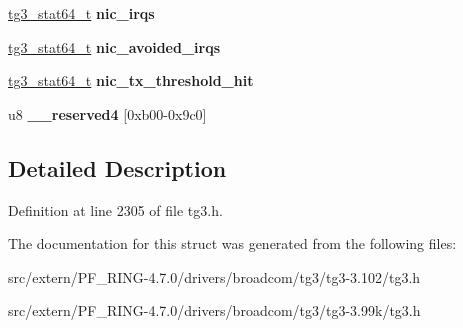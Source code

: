 \begin{DoxyCompactItemize}
\item 
\hypertarget{structtg3__hw__stats_a4246f9d461fb7c092804bb0cc6f0c941}{
\hyperlink{structtg3__stat64__t}{tg3\_\-stat64\_\-t} {\bfseries nic\_\-irqs}}
\label{structtg3__hw__stats_a4246f9d461fb7c092804bb0cc6f0c941}

\item 
\hypertarget{structtg3__hw__stats_a5ecb13d8f275ba50a07dc9b93793f1bc}{
\hyperlink{structtg3__stat64__t}{tg3\_\-stat64\_\-t} {\bfseries nic\_\-avoided\_\-irqs}}
\label{structtg3__hw__stats_a5ecb13d8f275ba50a07dc9b93793f1bc}

\item 
\hypertarget{structtg3__hw__stats_ac1f165b6afd4d0a8c704101ab9156c50}{
\hyperlink{structtg3__stat64__t}{tg3\_\-stat64\_\-t} {\bfseries nic\_\-tx\_\-threshold\_\-hit}}
\label{structtg3__hw__stats_ac1f165b6afd4d0a8c704101ab9156c50}

\item 
\hypertarget{structtg3__hw__stats_af5d67da821e3ef25c601eaa375aa42f8}{
u8 {\bfseries \_\-\_\-reserved4} \mbox{[}0xb00-\/0x9c0\mbox{]}}
\label{structtg3__hw__stats_af5d67da821e3ef25c601eaa375aa42f8}

\end{DoxyCompactItemize}


\subsection{Detailed Description}


Definition at line 2305 of file tg3.h.



The documentation for this struct was generated from the following files:\begin{DoxyCompactItemize}
\item 
src/extern/PF\_\-RING-\/4.7.0/drivers/broadcom/tg3/tg3-\/3.102/tg3.h\item 
src/extern/PF\_\-RING-\/4.7.0/drivers/broadcom/tg3/tg3-\/3.99k/tg3.h\end{DoxyCompactItemize}
